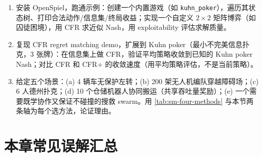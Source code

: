 \begin{practice}
\begin{enumerate}
  \item 安装 OpenSpiel，跑通示例：创建一个内置游戏（如 \texttt{kuhn\_poker}），遍历其状态树、打印合法动作/信息集/终局收益；实现一个自定义 $2\times2$ 矩阵博弈（如囚徒困境），用 CFR 求近似 Nash，用 exploitability 评估求解质量。
  \item 复现 CFR regret matching demo，扩展到 Kuhn poker（最小不完美信息扑克，3 张牌）：在信息集上做 CFR，验证平均策略收敛到已知的 Kuhn poker Nash；对比 CFR 和 CFR+ 的收敛速度（用平均策略评估，不是当前策略）。
  \item 给定五个场景：(a) 4 辆车无保护左转；(b) 200 架无人机编队穿越障碍场；(c) 6 人德州扑克；(d) 10 个仓储机器人协同搬运（共享吞吐量奖励）；(e) 一个需要既学协作又保证不碰撞的搜救 swarm。用 \cref{tab:sm-four-methods} 与本节两条轴为每个选方法，论证理由。
\end{enumerate}
\end{practice}

\section*{本章常见误解汇总}

